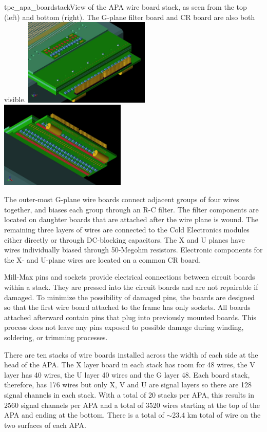 \begin{cdrfigure}{tpc_apa_boardstack}{View of the APA wire board stack, as seen from the top (left) and bottom (right).  The G-plane filter board and CR board are also both visible.}
\includegraphics[width=0.45\textwidth]{figures/tpc_apa_boardstack_top.png}
\includegraphics[width=0.45\textwidth]{figures/tpc_apa_boardstack_bottom.png}
\end{cdrfigure}

The outer-most G-plane wire boards connect adjacent groups of four wires together, and biases each group through an R-C filter. The filter components are located on daughter boards that are attached after the wire plane is wound. The remaining three layers of wires are connected to the Cold Electronics modules either directly or through DC-blocking capacitors. The X and U planes have wires individually biased through 50-Megohm resistors. Electronic components for the X- and U-plane wires are located on a common CR board.

Mill-Max pins and sockets provide electrical connections between circuit boards within a stack. They are pressed into the circuit boards and are not repairable if damaged. To minimize the possibility of damaged pins, the boards are designed so that the first wire board attached to the frame has only sockets. All boards attached afterward contain pins that plug into previously mounted boards. This process does not leave any pins exposed to possible damage during winding, soldering, or trimming processes.

There are ten stacks of wire boards installed across the width of each side at the head of the APA.  The X layer board in each stack has room for 48 wires, the V layer has 40 wires, the U layer 40 wires and the G layer 48.  Each board stack, therefore, has 176 wires but only X, V and U are signal layers so there are 128 signal channels in each stack.  With a total of 20 stacks per APA, this results in 2560 signal channels per APA and a total of 3520 wires starting at the top of the APA and ending at the bottom.  There is a total of $\sim$23.4 km total of wire on the two surfaces of each APA.  

